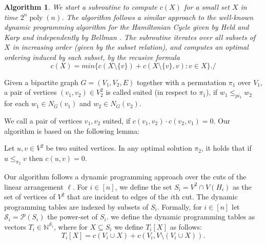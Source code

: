 \documentclass[a4paper,UKenglish,cleveref, autoref, thm-restate]{lipics-v2021}
\newtheorem{algorithm}{Algorithm}
\begin{document}
\begin{algorithm}\label{alg:subroutine}
    We start a subroutine to compute $c(X)$ for a small set $X$ in time $2^n\operatorname{poly}(n)$. The algorithm follows a similar approach to the well-known dynamic programming algorithm for the Hamiltonian Cycle given by Held and Karp \cite{DBLP:conf/acm/HeldK61} and independently by Bellman \cite{bellman1958combinatorial}. The subroutine iterates over all subsets of $X$ in increasing order (given by the subset relation), and computes an optimal ordering induced by each subset, by the recusive formula
    \[c(X) = min\{c(X\setminus\{v\}) + c(X\setminus \{v\}, v)\colon v \in X\}./\]    
\end{algorithm}

\begin{definition}
    Given a bipartite graph $G= (V_1, V_2, E)$ together with a permutation $\pi_1$ over $V_1$, a pair of vertices $(v_1,v_2)\in V_2^2$ is called suited (in respect to $\pi_1$), if $w_1\leq_{pi_1}w_2$ for each $w_1\in N_G(v_1)$ and $w_2\in N_G(v_2)$.
\end{definition}
We call a pair of vertices $v_1, v_2$ suited, if $c(v_1,v_2)\cdot c(v_2,v_1) = 0$.
Our algorithm is based on the following lemma:
\begin{lemma}
    Let $u,v \in V^2$ be two suited vertices. In any optimal solution $\pi_2$, it holds that if $u\leq_{\pi_2} v$ then $c(u,v) = 0$.
\end{lemma}
Our algorithm follows a dynamic programming approach over the cuts of the linear arrangement $\ell$.
For $i\in[n]$, we define the set $S_i = V^2 \cap V(H_i)$ as the set of vertices of $V^2$ that are incident to edges of the $i$th cut.
The dynamic programming tables are indexed by subsets of $S_i$.
Formally, for $i\in [n]$ let $\mathcal{S}_i = \mathcal{P}(S_i)$ the power-set of $S_i$. we define the dynamic programming tables as vectors $T_i \in \mathbb{N}^{\mathcal{S}_i}$, where for $X\subseteq S_i$ we define $T_i[X]$ as follows:
\[T_i[X] = c(V_i\cup X) + c(V_i, V\setminus (V_i\cup X)).\]
\end{document}
